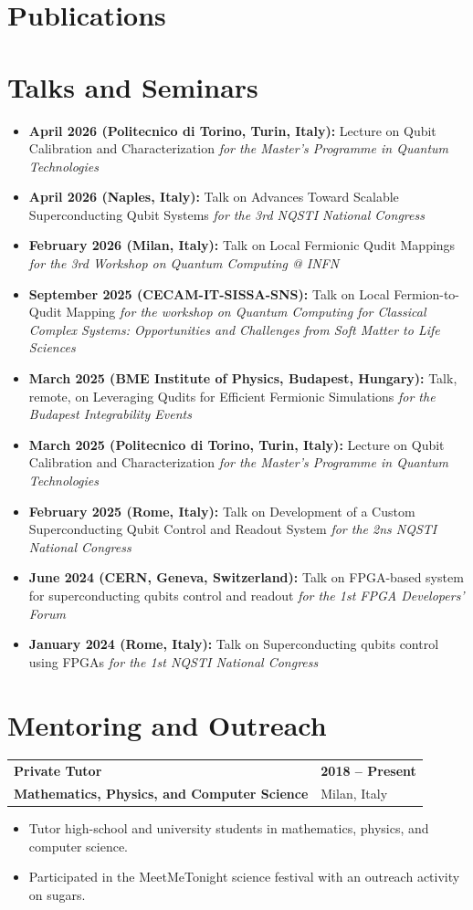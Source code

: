 \documentclass[10pt,a4paper]{article}
\makeatletter
\newcommand{\cvsection}[1]{%
  \Needspace{7\baselineskip}%
  \section{#1}%
}
\newcommand{\cventry}[4]{%
  \Needspace{4\baselineskip}%
  \par\addvspace{0.45em}%
  \begin{tabularx}{\textwidth}{@{}X>{\raggedleft\arraybackslash}p{5.45cm}@{}}
    {\large\bfseries\color{DarkGrey}#1} & {\small\bfseries\color{AccentMuted}#3} \\
    {\bfseries\color{Accent}#2} & {\small\color{BodyGrey}#4}
  \end{tabularx}%
  \vspace{-0.2em}
}
\makeatother
\begin{document}
\cvsection{Publications}

\nocite{*}
\printbibliography[heading=none]

\cvsection{Talks and Seminars}

\begin{itemize}
    \item \textbf{April 2026 (Politecnico di Torino, Turin, Italy):} Lecture on Qubit Calibration and Characterization \textit{for the Master's Programme in Quantum Technologies}    
    \item \textbf{April 2026 (Naples, Italy):} Talk on Advances Toward Scalable Superconducting Qubit Systems \textit{for the 3rd NQSTI National Congress}
    \item \textbf{February 2026 (Milan, Italy):} Talk on Local Fermionic Qudit Mappings \textit{for the 3rd Workshop on Quantum Computing @ INFN}
    \item \textbf{September 2025 (CECAM-IT-SISSA-SNS):} Talk on Local Fermion-to-Qudit Mapping \textit{for the workshop on Quantum Computing for Classical Complex Systems: Opportunities and Challenges from Soft Matter to Life Sciences}
    \item \textbf{March 2025 (BME Institute of Physics, Budapest, Hungary):} Talk, remote, on Leveraging Qudits for Efficient Fermionic Simulations \textit{for the Budapest Integrability Events}  
    \item \textbf{March 2025 (Politecnico di Torino, Turin, Italy):} Lecture on Qubit Calibration and Characterization \textit{for the Master's Programme in Quantum Technologies}
    \item \textbf{February 2025 (Rome, Italy):} Talk on Development of a Custom Superconducting Qubit Control and Readout
System \textit{for the 2ns NQSTI National Congress}
    \item \textbf{June 2024 (CERN, Geneva, Switzerland):} Talk on FPGA-based system for superconducting qubits control and readout \textit{for the 1st FPGA Developers' Forum}
    \item \textbf{January 2024 (Rome, Italy):} Talk on Superconducting qubits control using FPGAs \textit{for the 1st NQSTI National Congress}
    
\end{itemize}

\cvsection{Mentoring and Outreach}

\cventry{Private Tutor}{Mathematics, Physics, and Computer Science}{2018 -- Present}{Milan, Italy}
\begin{itemize}
  \item Tutor high-school and university students in mathematics, physics, and computer science.
  \item Participated in the MeetMeTonight science festival with an outreach activity on sugars.
\end{itemize}
\end{document}
